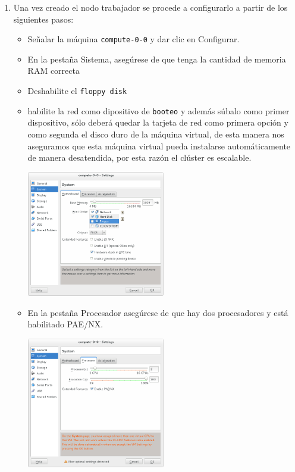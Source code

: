 \begin{enumerate}
\begin{itemize}
\end{itemize}

\item Una vez creado el nodo trabajador se procede a configurarlo a partir de los siguientes pasos:

\begin{itemize}
	\item Señalar la máquina \texttt{compute-0-0} y dar clic en Configurar.

	\item En la pestaña Sistema, asegúrese de que tenga la cantidad de memoria RAM correcta

	\item Deshabilite el \texttt{floppy disk}

	\item habilite la red como dipositivo de \texttt{booteo} y además súbalo como primer dispositivo, sólo deberá quedar la tarjeta de red como primera opción y como segunda el disco duro de la máquina virtual, de esta manera nos aseguramos que esta máquina virtual pueda instalarse automáticamente de manera desatendida, por esta razón el clúster es escalable. 

	\includegraphics[width=0.5\textwidth]{aux/nodoopsboot}


	\item En la pestaña Procesador asegúrese de que hay dos procesadores y está habilitado PAE/NX.


	\includegraphics[width=0.5\textwidth]{aux/nodoprocesadores}
	


\end{itemize}
\end{enumerate}
